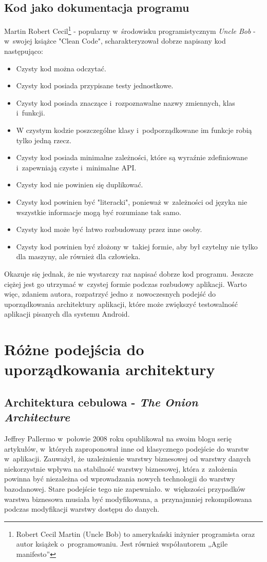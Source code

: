 \subsection{Kod jako dokumentacja programu}
\label{czysty_kod}
Martin Robert Cecil\footnote{Robert Cecil Martin (Uncle Bob) to amerykański inżynier programista oraz autor książek o~programowaniu. Jest również współautorem „Agile manifesto”} - popularny w~środowisku programistycznym \textit{Uncle Bob} - w~swojej książce "Clean Code"\cite{bib:cecil:clean_code}, scharakteryzował dobrze napisany kod następująco: 
\begin{itemize}
\item
Czysty kod można odczytać.
\item
Czysty kod posiada przypisane testy jednostkowe.
\item
Czysty kod posiada znaczące i~rozpoznawalne nazwy zmiennych, klas i~funkcji.
\item
W czystym kodzie poszczególne klasy i~podporządkowane im funkcje robią tylko jedną rzecz.
\item
Czysty kod posiada minimalne zależności, które są wyraźnie zdefiniowane i~zapewniają czyste i~minimalne API.
\item
Czysty kod nie powinien się duplikować.
\item
Czysty kod powinien być "literacki", ponieważ w~zależności od języka nie wszystkie informacje mogą być rozumiane tak samo.
\item
Czysty kod może być łatwo rozbudowany przez inne osoby.
\item
Czysty kod powinien być złożony w~takiej formie, aby był czytelny nie tylko dla maszyny, ale również dla człowieka.
\end{itemize}
Okazuje się jednak, że nie wystarczy raz napisać dobrze kod programu. Jeszcze ciężej jest go utrzymać w~czystej formie podczas rozbudowy aplikacji. Warto więc, zdaniem autora, rozpatrzyć jedno z~nowoczesnych podejść do uporządkowania architektury aplikacji, które może zwiększyć testowalność aplikacji pisanych dla systemu Android.

\section{Różne podejścia do uporządkowania architektury}
\subsection{Architektura cebulowa - \textit{The Onion Architecture}}
Jeffrey Pallermo w~połowie 2008 roku opublikował na swoim blogu serię artykułów\cite{website:architect:onion}, w~których zaproponował inne od klasycznego podejście do warstw w~aplikacji. Zauważył, że uzależnienie warstwy biznesowej od warstwy danych niekorzystnie wpływa na stabilność warstwy biznesowej, która z~założenia powinna być niezależna od wprowadzania nowych technologii do warstwy bazodanowej. Stare podejście tego nie zapewniało. w~większości przypadków warstwa biznesowa musiała być modyfikowana, a~przynajmniej rekompilowana podczas modyfikacji warstwy dostępu do danych.

